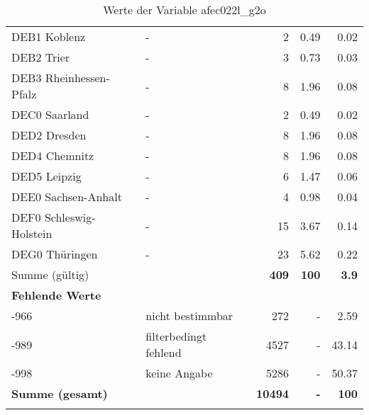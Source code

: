 \begin{longtable}{Xlrrr}
        \multicolumn{1}{X}{DEB1 Koblenz} & - & \num{2} & \num[round-mode=places,round-precision=2]{0.49} & \num[round-mode=places,round-precision=2]{0.02} \\
        \multicolumn{1}{X}{DEB2 Trier} & - & \num{3} & \num[round-mode=places,round-precision=2]{0.73} & \num[round-mode=places,round-precision=2]{0.03} \\
        \multicolumn{1}{X}{DEB3 Rheinhessen-Pfalz} & - & \num{8} & \num[round-mode=places,round-precision=2]{1.96} & \num[round-mode=places,round-precision=2]{0.08} \\
        \multicolumn{1}{X}{DEC0 Saarland} & - & \num{2} & \num[round-mode=places,round-precision=2]{0.49} & \num[round-mode=places,round-precision=2]{0.02} \\
        \multicolumn{1}{X}{DED2 Dresden} & - & \num{8} & \num[round-mode=places,round-precision=2]{1.96} & \num[round-mode=places,round-precision=2]{0.08} \\
        \multicolumn{1}{X}{DED4 Chemnitz} & - & \num{8} & \num[round-mode=places,round-precision=2]{1.96} & \num[round-mode=places,round-precision=2]{0.08} \\
        \multicolumn{1}{X}{DED5 Leipzig} & - & \num{6} & \num[round-mode=places,round-precision=2]{1.47} & \num[round-mode=places,round-precision=2]{0.06} \\
        \multicolumn{1}{X}{DEE0 Sachsen-Anhalt} & - & \num{4} & \num[round-mode=places,round-precision=2]{0.98} & \num[round-mode=places,round-precision=2]{0.04} \\
        \multicolumn{1}{X}{DEF0 Schleswig-Holstein} & - & \num{15} & \num[round-mode=places,round-precision=2]{3.67} & \num[round-mode=places,round-precision=2]{0.14} \\
        \multicolumn{1}{X}{DEG0 Thüringen} & - & \num{23} & \num[round-mode=places,round-precision=2]{5.62} & \num[round-mode=places,round-precision=2]{0.22} \\
     \midrule
      \multicolumn{2}{l}{Summe (gültig)} & \textbf{\num{409}} &
      \textbf{\num{100}} &
         \textbf{\num[round-mode=places,round-precision=2]{3.9}} \\
     \multicolumn{5}{l}{\textbf{Fehlende Werte}}\\
       -966 & nicht bestimmbar & \num{272} & - & \num[round-mode=places,round-precision=2]{2.59} \\

       -989 & filterbedingt fehlend & \num{4527} & - & \num[round-mode=places,round-precision=2]{43.14} \\

       -998 & keine Angabe & \num{5286} & - & \num[round-mode=places,round-precision=2]{50.37} \\

     \midrule
     \multicolumn{2}{l}{\textbf{Summe (gesamt)}} & \textbf{\num{10494}} & \textbf{-} & \textbf{\num{100}} \\
     \bottomrule
     \caption{Werte der Variable afec022l\_g2o}
     \end{longtable}
     
